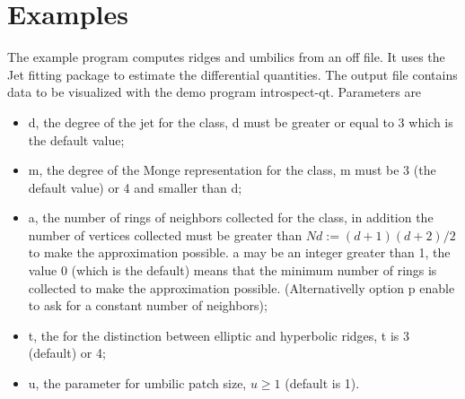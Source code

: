 \section{Examples} 
\label{examples}

The example program computes ridges and umbilics from an off file. It
uses the Jet fitting package to estimate the differential quantities.
The output file contains data to be visualized with the demo program introspect-qt.
Parameters are 
\begin{itemize}
\item
d, the degree of the jet for the  class, d
must be greater or equal to 3 which is the default value;
\item
m, the degree of the Monge representation for the
 class, m must be 3 (the default value) or
4 and smaller than d;
\item
a, the number of rings of neighbors collected for the
 class, in addition the number of vertices
collected must be greater than $Nd:=(d+1)(d+2)/2$ to make the
approximation possible. a may be an integer greater than 1, the value
0 (which is the default) means that the minimum number of rings is
collected to make the approximation possible. (Alternativelly option p
enable to ask for a constant number of neighbors);
\item
t, the  for the distinction between elliptic and
hyperbolic ridges, t is 3 (default) or 4;
\item
u, the parameter for umbilic patch size, $u \geq 1$ (default is 1).
\end{itemize}

